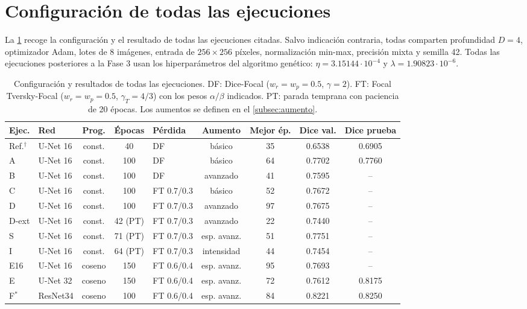 \section{Configuración de todas las ejecuciones}\label{app:configuraciones}

La \cref{tab:todas} recoge la configuración y el resultado de todas las ejecuciones citadas. Salvo indicación contraria, todas comparten profundidad $D=4$, optimizador Adam, lotes de 8 imágenes, entrada de $256\times256$ píxeles, normalización min-max, precisión mixta y semilla 42. Todas las ejecuciones posteriores a la Fase 3 usan los hiperparámetros del algoritmo genético: $\eta=3.15144\cdot10^{-4}$ y $\lambda=1.90823\cdot10^{-6}$.

\begin{table}[htbp]
  \centering
  \caption{Configuración y resultados de todas las ejecuciones. DF: Dice-Focal ($w_r=w_p=0.5$, $\gamma=2$). FT: Focal Tversky-Focal ($w_r=w_p=0.5$, $\gamma_T=4/3$) con los pesos $\alpha/\beta$ indicados. PT: parada temprana con paciencia de 20 épocas. Los aumentos se definen en el \cref{subsec:aumento}.}
  \label{tab:todas}
  \small
  \setlength{\tabcolsep}{3.4pt}
  \begin{tabular}{llcclcccc}
    \toprule
    \textbf{Ejec.} & \textbf{Red} & \textbf{Prog.} & \textbf{Épocas} & \textbf{Pérdida} & \textbf{Aumento} & \textbf{Mejor ép.} & \textbf{Dice val.} & \textbf{Dice prueba} \\
    \midrule
    Ref.$^{\dagger}$ & U-Net 16 & const. & 40 & DF & básico & 35 & 0.6538 & 0.6905 \\
    A     & U-Net 16 & const. & 100 & DF & básico & 64 & 0.7702 & 0.7760 \\
    B     & U-Net 16 & const. & 100 & DF & avanzado & 41 & 0.7595 & -- \\
    C     & U-Net 16 & const. & 100 & FT 0.7/0.3 & básico & 52 & 0.7672 & -- \\
    D     & U-Net 16 & const. & 100 & FT 0.7/0.3 & avanzado & 97 & 0.7675 & -- \\
    D-ext & U-Net 16 & const. & 42 (PT) & FT 0.7/0.3 & avanzado & 22 & 0.7440 & -- \\
    S     & U-Net 16 & const. & 71 (PT) & FT 0.7/0.3 & esp. avanz. & 51 & 0.7751 & -- \\
    I     & U-Net 16 & const. & 64 (PT) & FT 0.7/0.3 & intensidad & 44 & 0.7454 & -- \\
    E16   & U-Net 16 & coseno & 150 & FT 0.6/0.4 & esp. avanz. & 95 & 0.7693 & -- \\
    E     & U-Net 32 & coseno & 150 & FT 0.6/0.4 & esp. avanz. & 72 & 0.7612 & 0.8175 \\
    F$^{\ast}$ & ResNet34 & coseno & 100 & FT 0.6/0.4 & esp. avanz. & 84 & 0.8221 & 0.8250 \\
    \bottomrule
  \end{tabular}


\end{table}
